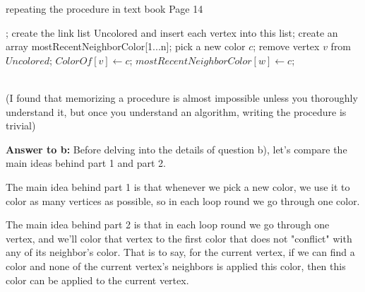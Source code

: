\documentclass[a4paper,11pt]{article}
\theoremstyle{mytheor}
\begin{document}
\iffalse
\begin{lstlisting}[label={list:ninth0},caption=repeating the procedure in text book Page 14]
procedure color(n, Neighbors[1...n], ColorOf[1...n]);
  create the link list Uncolored and insert each vertex into this list
  create an array mostRecentNeighborColor[1...n]
  while Uncolored is not empty:
    pick a new color c
    foreach vertex v in Uncolored:
      if mostRecentNeighborColor[v] is not c:
        remove vertex v from Uncolored;
        ColorOf[v] = c;
        foreach neighbor w of vertex v:
          mostRecentNeighborColor[w] = c;
        endfor
      endif
    endfor
  endwhile
endprocedure
\end{lstlisting}
\fi

\begin{algorithm}[H]
\caption{repeating the procedure in text book Page 14}\label{Ex16a}
\begin{algorithmic}[1]
;
  \State create the link list Uncolored and insert each vertex into this list;
  \State create an array mostRecentNeighborColor[1...n];
    \State pick a new color $c$;
        \State remove vertex $v$ from $Uncolored$;
        \State $ColorOf[v] \gets c$;
          \State $mostRecentNeighborColor[w] \gets c$;
        \EndFor
      \EndIf
    \EndFor
  \EndWhile
\EndProcedure
\end{algorithmic}
\end{algorithm}

~\\

(I found that memorizing a procedure is almost impossible unless you thoroughly understand it, but once you understand an algorithm, writing the procedure is trivial)

\vspace{1.2in}


\textbf{Answer to b:}
Before delving into the details of question b), let's compare the main ideas behind part 1 and part 2. 

The main idea behind part 1 is that whenever we pick a new color, we use it to color as many vertices as possible, so in each loop round we go through one color.

The main idea behind part 2 is that in each loop round we go through one vertex, and we'll color that vertex to the first color that does not "conflict" with any of its neighbor's color. That is to say, for the current vertex, if we can find a color and none of the current vertex's neighbors is applied this color, then this color can be applied to the current vertex.
\end{document}
